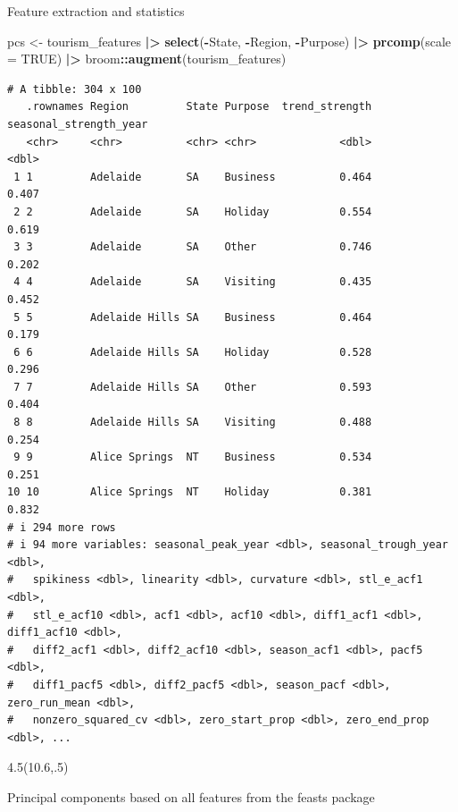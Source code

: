 \documentclass[
  14pt,
  ignorenonframetext,
  aspectratio=169,
]{beamer}
\newenvironment{Shaded}{\begin{snugshade}}{\end{snugshade}}
\newcommand{\AttributeTok}[1]{\textcolor[rgb]{0.13,0.29,0.53}{#1}}
\newcommand{\ConstantTok}[1]{\textcolor[rgb]{0.56,0.35,0.01}{#1}}
\newcommand{\FunctionTok}[1]{\textcolor[rgb]{0.13,0.29,0.53}{\textbf{#1}}}
\newcommand{\NormalTok}[1]{#1}
\newcommand{\OtherTok}[1]{\textcolor[rgb]{0.56,0.35,0.01}{#1}}
\newcommand{\SpecialCharTok}[1]{\textcolor[rgb]{0.81,0.36,0.00}{\textbf{#1}}}
\renewenvironment{Shaded}{\vspace*{0.15cm}\color{black}\fontsize{10}{10}\sf\begin{snugshade}\color{black}}{\end{snugshade}}
\begin{document}
\begin{frame}[fragile]{Feature extraction and statistics}
\protect{}\label{feature-extraction-and-statistics-6}
\begin{Shaded}
\begin{Highlighting}[]
\NormalTok{pcs }\OtherTok{\textless{}{-}}\NormalTok{ tourism\_features }\SpecialCharTok{|\textgreater{}}
  \FunctionTok{select}\NormalTok{(}\SpecialCharTok{{-}}\NormalTok{State, }\SpecialCharTok{{-}}\NormalTok{Region, }\SpecialCharTok{{-}}\NormalTok{Purpose) }\SpecialCharTok{|\textgreater{}}
  \FunctionTok{prcomp}\NormalTok{(}\AttributeTok{scale =} \ConstantTok{TRUE}\NormalTok{) }\SpecialCharTok{|\textgreater{}}
\NormalTok{  broom}\SpecialCharTok{::}\FunctionTok{augment}\NormalTok{(tourism\_features)}
\end{Highlighting}
\end{Shaded}

\fontsize{8}{8}\sf\vspace*{-0.3cm}

\begin{verbatim}
# A tibble: 304 x 100
   .rownames Region         State Purpose  trend_strength seasonal_strength_year
   <chr>     <chr>          <chr> <chr>             <dbl>                  <dbl>
 1 1         Adelaide       SA    Business          0.464                  0.407
 2 2         Adelaide       SA    Holiday           0.554                  0.619
 3 3         Adelaide       SA    Other             0.746                  0.202
 4 4         Adelaide       SA    Visiting          0.435                  0.452
 5 5         Adelaide Hills SA    Business          0.464                  0.179
 6 6         Adelaide Hills SA    Holiday           0.528                  0.296
 7 7         Adelaide Hills SA    Other             0.593                  0.404
 8 8         Adelaide Hills SA    Visiting          0.488                  0.254
 9 9         Alice Springs  NT    Business          0.534                  0.251
10 10        Alice Springs  NT    Holiday           0.381                  0.832
# i 294 more rows
# i 94 more variables: seasonal_peak_year <dbl>, seasonal_trough_year <dbl>,
#   spikiness <dbl>, linearity <dbl>, curvature <dbl>, stl_e_acf1 <dbl>,
#   stl_e_acf10 <dbl>, acf1 <dbl>, acf10 <dbl>, diff1_acf1 <dbl>, diff1_acf10 <dbl>,
#   diff2_acf1 <dbl>, diff2_acf10 <dbl>, season_acf1 <dbl>, pacf5 <dbl>,
#   diff1_pacf5 <dbl>, diff2_pacf5 <dbl>, season_pacf <dbl>, zero_run_mean <dbl>,
#   nonzero_squared_cv <dbl>, zero_start_prop <dbl>, zero_end_prop <dbl>, ...
\end{verbatim}

\begin{textblock}{4.5}(10.6,.5)
\begin{alertblock}{}\fontsize{10}{12}\sf
Principal components based on all features from the feasts package
\end{alertblock}
\end{textblock}
\end{frame}
\end{document}
